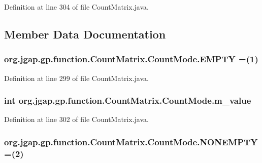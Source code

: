 Definition at line 304 of file Count\-Matrix.\-java.



\subsection{Member Data Documentation}
\hypertarget{enumorg_1_1jgap_1_1gp_1_1function_1_1_count_matrix_1_1_count_mode_a92f9a66ce5d36d5d7011fc6678714b7a}{
\subsubsection[{E\-M\-P\-T\-Y}]{\setlength{\rightskip}{0pt plus 5cm}org.\-jgap.\-gp.\-function.\-Count\-Matrix.\-Count\-Mode.\-E\-M\-P\-T\-Y =(1)}}\label{enumorg_1_1jgap_1_1gp_1_1function_1_1_count_matrix_1_1_count_mode_a92f9a66ce5d36d5d7011fc6678714b7a}


Definition at line 299 of file Count\-Matrix.\-java.

\hypertarget{enumorg_1_1jgap_1_1gp_1_1function_1_1_count_matrix_1_1_count_mode_ab24868b4fd32e75d5a6f0d2c4964ca03}{
\subsubsection[{m\-\_\-value}]{\setlength{\rightskip}{0pt plus 5cm}int org.\-jgap.\-gp.\-function.\-Count\-Matrix.\-Count\-Mode.\-m\-\_\-value\hspace{0.3cm}{\ttfamily [private]}}}\label{enumorg_1_1jgap_1_1gp_1_1function_1_1_count_matrix_1_1_count_mode_ab24868b4fd32e75d5a6f0d2c4964ca03}


Definition at line 302 of file Count\-Matrix.\-java.

\hypertarget{enumorg_1_1jgap_1_1gp_1_1function_1_1_count_matrix_1_1_count_mode_a62fbc7b1b3e5481759b6841ab3ec0369}{
\subsubsection[{N\-O\-N\-E\-M\-P\-T\-Y}]{\setlength{\rightskip}{0pt plus 5cm}org.\-jgap.\-gp.\-function.\-Count\-Matrix.\-Count\-Mode.\-N\-O\-N\-E\-M\-P\-T\-Y =(2)}}\label{enumorg_1_1jgap_1_1gp_1_1function_1_1_count_matrix_1_1_count_mode_a62fbc7b1b3e5481759b6841ab3ec0369}


